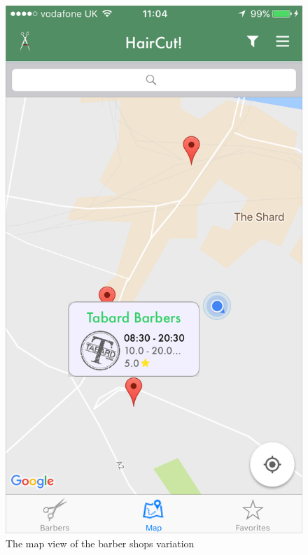 \begin{figure}[!ht]
\centering
\includegraphics[scale=0.3]{img/barber-maps.png}
\caption{The map view of the barber shops variation}
\label{fig:iosmap}
\end{figure}